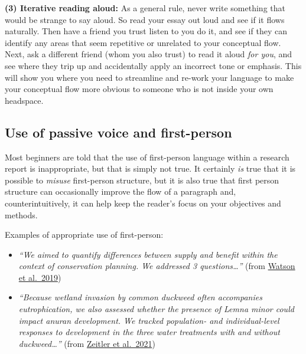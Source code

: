 \documentclass[]{book}
\begin{document}
\textbf{(3) Iterative reading aloud:} As a general rule, never write something that would be strange to say aloud. So read your essay out loud and see if it flows naturally. Then have a friend you trust listen to you do it, and see if they can identify any areas that seem repetitive or unrelated to your conceptual flow. Next, ask a different friend (whom you also trust) to read it aloud \emph{for you}, and see where they trip up and accidentally apply an incorrect tone or emphasis. This will show you where you need to streamline and re-work your language to make your conceptual flow more obvious to someone who is not inside your own headspace.

\hypertarget{use-of-passive-voice-and-first-person}{%
\subsection*{Use of passive voice and first-person}\label{use-of-passive-voice-and-first-person}}

Most beginners are told that the use of first-person language within a research report is inappropriate, but that is simply not true. It certainly \emph{is} true that it is possible to \emph{misuse} first-person structure, but it is also true that first person structure can occasionally improve the flow of a paragraph and, counterintuitively, it can help keep the reader's focus on your objectives and methods.

Examples of appropriate use of first-person:

\begin{itemize}
\item
  \emph{``We aimed to quantify differences between supply and benefit within the context of conservation planning. We addressed 3 questions\ldots{}''} (from \href{https://conbio.onlinelibrary.wiley.com/doi/full/10.1111/cobi.13276}{Watson et al.~2019})
\item
  \emph{``Because wetland invasion by common duckweed often accompanies eutrophication, we also assessed whether the presence of Lemna minor could impact anuran development. We tracked population- and individual-level responses to development in the three water treatments with and without duckweed\ldots{}''} (from \href{https://www.sciencedirect.com/science/article/pii/S0301479721006332?casa_token=BhsD4GiVQhIAAAAA:78wrLH-vN5gUPvNdX16fyaoHJq8QVQpQ-mqVA6UqxpxLMOFKweuX0YwJtBMLMnmVnfU4e1k}{Zeitler et al.~2021})
\end{itemize}
\end{document}
